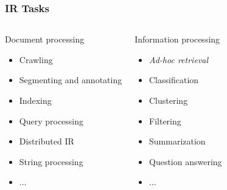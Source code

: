\documentclass[svgnames]{beamer}
\begin{document}
\begin{frame}
    \frametitle{IR Tasks}

    \begin{columns}[t]


        \begin{block}{Document processing}
            \begin{itemize}
            \item Crawling
            \item Segmenting and annotating
            \item Indexing
            \item Query processing
            \item Distributed IR
            \item String processing
            \item ...
            \end{itemize}
        \end{block}


        \begin{block}{Information processing}
            \begin{itemize}
            \item \emph{\textit{Ad-hoc} retrieval}
            \item Classification
            \item Clustering
            \item Filtering
            \item Summarization
            \item Question answering
            \item ...
            \end{itemize}
        \end{block}

    \end{columns}
\end{frame}



\end{document}
